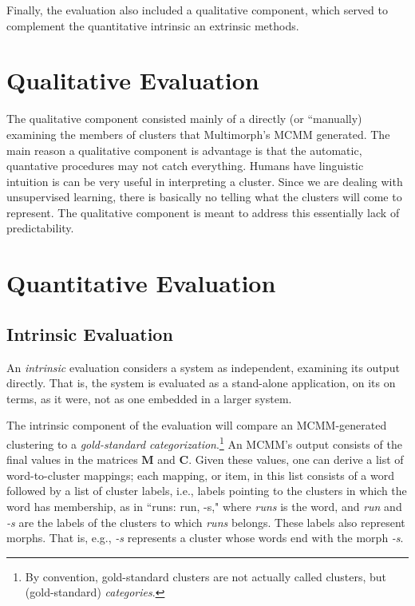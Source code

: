 Finally, the evaluation also included a qualitative component, which served to complement the quantitative 
 intrinsic an extrinsic methods.


\section{Qualitative Evaluation}
The qualitative component consisted mainly of a directly (or ``manually) examining the members of clusters that Multimorph's MCMM generated. 
The main reason a qualitative component is advantage is that the automatic, quantative procedures may not catch everything. Humans have linguistic intuition is can be very useful in interpreting a cluster. Since we are dealing with unsupervised learning, there is basically no telling what the clusters will come to represent. The qualitative component is meant to address this essentially lack of predictability.

\section{Quantitative Evaluation}
\subsection{Intrinsic Evaluation}
An \emph{intrinsic} evaluation considers a system as independent, examining its 
output directly. That is, the system is evaluated as a stand-alone application, on its
on terms, as it were,
not as one embedded in a larger system.

The intrinsic component of the evaluation will compare an MCMM-generated clustering to a 
\emph{gold-standard categorization}.\footnote{By convention, 
gold-standard clusters are not actually called clusters, 
but (gold-standard) \emph{categories}.} 
An MCMM's output consists of 
the final values in the matrices $\mathbf{M}$ and $\mathbf{C}$.
Given these values, one can derive a list of word-to-cluster mappings; 
each mapping, or item, in this list
consists of a word followed by a list of cluster labels, i.e., labels pointing to
the clusters in which the word has membership, 
as in ``runs: run, -s,"  where \textit{runs} is the word, and \textit{run} and \textit{-s} 
are the labels of the clusters to which \textit{runs} belongs. These labels also represent 
morphs. That is, e.g., \emph{-s} represents a cluster whose words end with the morph 
\emph{-s}.

